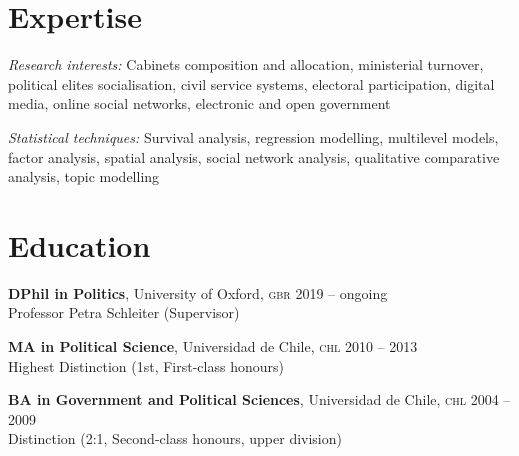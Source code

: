 \documentclass[letterpaper,margin]{res}
\begin{document}
\begin{resume} 


\section{\footnotesize Expertise}

{\small {\itshape Research interests:} Cabinets composition and allocation, ministerial turnover, political elites socialisation, civil service systems, electoral participation, digital media, online social networks, electronic and open government}

{\small {\itshape Statistical techniques:} Survival analysis, regression modelling, multilevel models, factor analysis, spatial analysis, social network analysis, qualitative comparative analysis,  topic modelling}

  
\section{\footnotesize Education}

{\small {\bfseries DPhil in Politics}, University of Oxford, {\scshape gbr}} \hfill {\small 2019 -- ongoing}\\
{\small Professor Petra Schleiter (Supervisor)}

{\small {\bfseries MA in Political Science}, Universidad de Chile, {\scshape chl}} \hfill {\small 2010 -- 2013}\\
{\small Highest Distinction (1st, First-class honours)}

{\small {\bfseries BA in Government and Political Sciences}, Universidad de Chile, {\scshape chl}}  \hfill {\small 2004 -- 2009}\\
{\small Distinction (2:1, Second-class honours, upper division)}


\end{resume}
\end{document}
